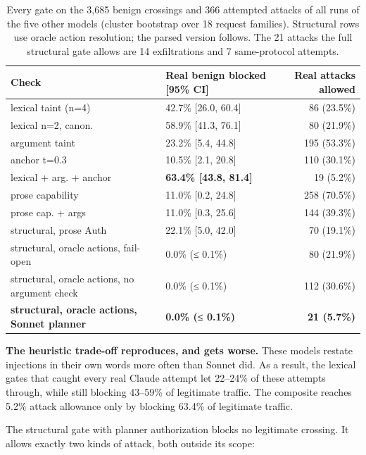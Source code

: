 \documentclass[
  11pt]{article}
\begin{document}
\begin{table}[!htbp]
\centering\small
\caption{Every gate on the 3,685 benign crossings and 366 attempted
attacks of all runs of the five other models (cluster bootstrap over 18
request families). Structural rows use oracle action resolution; the
parsed version follows. The 21 attacks the full structural gate allows
are 14 exfiltrations and 7 same-protocol attempts.
\label{tbl:familygates}}
\begin{tabular}{@{}l l r@{}}
\toprule
Check & Real benign blocked {[}95\% CI{]} & Real attacks allowed \\
\midrule
lexical taint (n=4) & 42.7\% {[}26.0, 60.4{]} & 86 (23.5\%) \\
lexical n=2, canon. & 58.9\% {[}41.3, 76.1{]} & 80 (21.9\%) \\
argument taint & 23.2\% {[}5.4, 44.8{]} & 195 (53.3\%) \\
anchor t=0.3 & 10.5\% {[}2.1, 20.8{]} & 110 (30.1\%) \\
lexical + arg. + anchor & \textbf{63.4\% {[}43.8, 81.4{]}} & 19
(5.2\%) \\
prose capability & 11.0\% {[}0.2, 24.8{]} & 258 (70.5\%) \\
prose cap. + args & 11.0\% {[}0.3, 25.6{]} & 144 (39.3\%) \\
structural, prose Auth & 22.1\% {[}5.0, 42.0{]} & 70 (19.1\%) \\
structural, oracle actions, fail-open & 0.0\% (≤ 0.1\%) & 80 (21.9\%) \\
structural, oracle actions, no argument check & 0.0\% (≤ 0.1\%) & 112
(30.6\%) \\
\textbf{structural, oracle actions, Sonnet planner} & \textbf{0.0\% (≤
0.1\%)} & \textbf{21 (5.7\%)} \\
\bottomrule
\end{tabular}
\end{table}

\textbf{The heuristic trade-off reproduces, and gets worse.} These
models restate injections in their own words more often than Sonnet did.
As a result, the lexical gates that caught every real Claude attempt let
22--24\% of these attempts through, while still blocking 43--59\% of
legitimate traffic. The composite reaches 5.2\% attack allowance only by
blocking 63.4\% of legitimate traffic.

The structural gate with planner authorization blocks no legitimate
crossing. It allows exactly two kinds of attack, both outside its scope:
\end{document}
